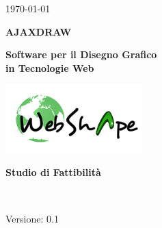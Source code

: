 
\title{\TITOLODOC}
\author{Mirco Geremia}



\renewcommand{\insertversion}{0.1} %
\renewcommand{\TITOLODOC}{Studio di Fattibilit\`{a}} %
\renewcommand{\glosspath}{.\glossario} %

\begin{titlepage}
\begin{center}
	\begin{Large}	\today \end{Large}
\end{center}

\vspace{20pt}

\begin{center}
	\begin{Huge}
				\textbf{AJAXDRAW}
	\end{Huge}
\end{center}			

\begin{center}
	\begin{large}
				\textbf{Software per il Disegno Grafico\\ in Tecnologie Web}
	\end{large}
\end{center}			

\vspace{20pt}

\begin{center}
\includegraphics[width=150pt]{../logo/logo}
\end{center}

\vspace{170pt}
\begin{center} %
	\begin{Huge}
				\textbf{\TITOLODOC}
	\end{Huge}
			\\
\end{center}
\vspace{210pt}
\begin{center}
Versione: \insertversion
\end{center}
\end{titlepage}

